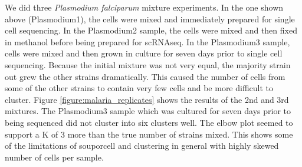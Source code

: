 \par{
We did three \textit{Plasmodium falciparum} mixture experiments. In the one shown above (Plasmodium1), the cells were mixed and immediately prepared for single cell sequencing. In the Plasmodium2 sample, the cells were mixed and then fixed in methanol before being prepared for scRNAseq. In the Plasmodium3 sample, cells were mixed and then grown in culture for seven days prior to single cell sequencing. Because the initial mixture was not very equal, the majority strain out grew the other strains dramatically. This caused the number of cells from some of the other strains to contain very few cells and be more difficult to cluster. Figure \ref{figure:malaria_replicates} shows the results of the 2nd and 3rd mixtures. The Plasmodium3 sample which was cultured for seven days prior to being sequenced did not cluster into six clusters well. The elbow plot seemed to support a K of 3 more than the true number of strains mixed. This shows some of the limitations of souporcell and clustering in general with highly skewed number of cells per sample.
}


